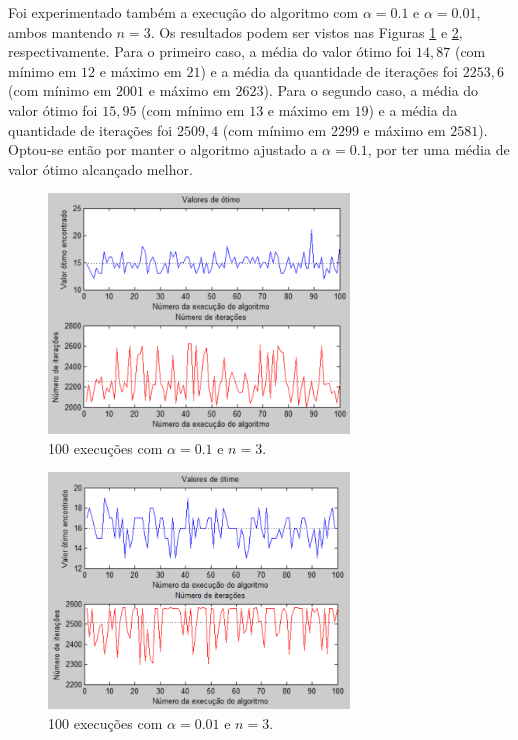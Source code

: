 \documentclass[conference]{IEEEtran}
\begin{document}
Foi experimentado também a execução do algoritmo com $\alpha = 0.1$ e $\alpha = 0.01$, ambos mantendo $n = 3$. Os resultados podem ser vistos nas Figuras \ref{fig:mult-result-2} e \ref{fig:mult-result-3}, respectivamente. Para o primeiro caso, a média do valor ótimo foi $14,87$ (com mínimo em $12$ e máximo em $21$) e a média da quantidade de iterações foi $2253,6$ (com mínimo em $2001$ e máximo em $2623$). Para o segundo caso, a média do valor ótimo foi $15,95$ (com mínimo em $13$ e máximo em $19$) e a média da quantidade de iterações foi $2509,4$ (com mínimo em $2299$ e máximo em $2581$). Optou-se então por manter o algoritmo ajustado a $\alpha = 0.1$, por ter uma média de valor ótimo alcançado melhor.

	\begin{figure}[h]
		\centering
		\includegraphics[width=8cm]{img/mult-result-2.png}
		\caption{100 execuções com $\alpha = 0.1$ e $n = 3$.}
		\label{fig:mult-result-2}
	\end{figure}
	
	\begin{figure}[h]
		\centering
		\includegraphics[width=8cm]{img/mult-result-3.png}
		\caption{100 execuções com $\alpha = 0.01$ e $n = 3$.}
		\label{fig:mult-result-3}
	\end{figure}
	
\end{document}
